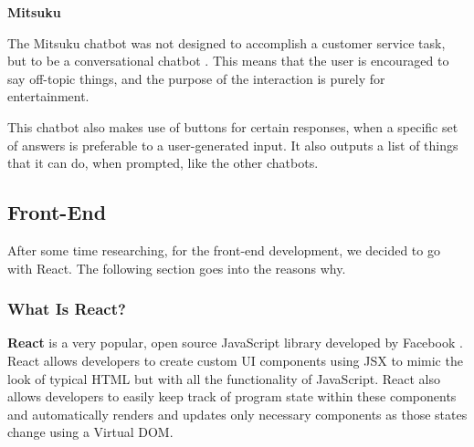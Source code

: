 \documentclass[titlepage, 12pt]{article}
\begin{document}


\textbf{Mitsuku}

The Mitsuku chatbot was not designed to accomplish a customer service task, but to be a conversational chatbot \cite{bib-1-18}. This means that the user is encouraged to say off-topic things, and the purpose of the interaction is purely for entertainment. 
 
This chatbot also makes use of buttons for certain responses, when a specific set of answers is preferable to a user-generated input. It also outputs a list of things that it can do, when prompted, like the other chatbots.



\subsection{Front-End}

After some time researching, for the front-end development, we decided to go with React. The following section goes into the reasons why.

\subsubsection{What Is React?}

\textbf{React} is a very popular, open source JavaScript library developed by Facebook \cite{bib-1-19}. React allows developers to create custom UI components using JSX to mimic the look of typical HTML but with all the functionality of JavaScript. React also allows developers to easily keep track of program state within these components and automatically renders and updates only necessary components as those states change using a Virtual DOM.
\end{document}
